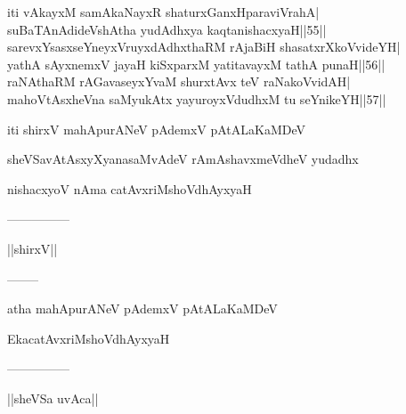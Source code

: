 \documentclass{article}
\begin{document}
iti vAkayxM samAkaNayxR shaturxGanxHparaviVrahA|\\
suBaTAnAdideVshAtha yudAdhxya kaqtanishacxyaH||55||\\
sarevxYsasxseYneyxVruyxdAdhxthaRM rAjaBiH shasatxrXkoVvideYH|\\
yathA sAyxnemxV jayaH kiSxparxM yatitavayxM tathA punaH||56||\\
raNAthaRM rAGavaseyxYvaM shurxtAvx teV raNakoVvidAH|\\
mahoVtAsxheVna saMyukAtx yayuroyxVdudhxM tu seYnikeYH||57||

\begin{center}
iti shirxV mahApurANeV pAdemxV pAtALaKaMDeV
\end{center}

\begin{center}
sheVSavAtAsxyXyanasaMvAdeV rAmAshavxmeVdheV yudadhx
\end{center}

\begin{center}
nishacxyoV nAma catAvxriMshoVdhAyxyaH
\end{center}

\begin{center}
---------------
\end{center}

\begin{center}
||shirxV||
\end{center}

\begin{center}
--------
\end{center}

\begin{center}
atha mahApurANeV pAdemxV pAtALaKaMDeV
\end{center}

\begin{center}
EkacatAvxriMshoVdhAyxyaH
\end{center}

\begin{center}
---------------
\end{center}

\begin{center}
||sheVSa uvAca||
\end{center}
\end{document}
